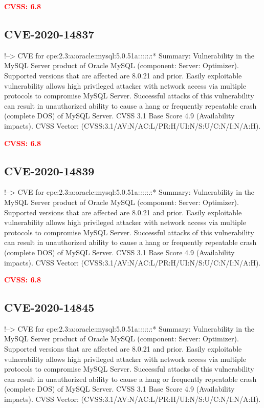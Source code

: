 \documentclass[a4paper, 12pt]{article}
\begin{document}
\textbf{\textcolor{red}{CVSS: 6.8}}

\hypertarget{cve-2020-14837}{%
\subsection{CVE-2020-14837}\label{cve-2020-14837}}

!--\textgreater{} CVE for
cpe:2.3:a:oracle:mysql:5.0.51a:\emph{:}:\emph{:}:\emph{:}:* Summary:
Vulnerability in the MySQL Server product of Oracle MySQL (component:
Server: Optimizer). Supported versions that are affected are 8.0.21 and
prior. Easily exploitable vulnerability allows high privileged attacker
with network access via multiple protocols to compromise MySQL Server.
Successful attacks of this vulnerability can result in unauthorized
ability to cause a hang or frequently repeatable crash (complete DOS) of
MySQL Server. CVSS 3.1 Base Score 4.9 (Availability impacts). CVSS
Vector: (CVSS:3.1/AV:N/AC:L/PR:H/UI:N/S:U/C:N/I:N/A:H).

\textbf{\textcolor{red}{CVSS: 6.8}}

\hypertarget{cve-2020-14839}{%
\subsection{CVE-2020-14839}\label{cve-2020-14839}}

!--\textgreater{} CVE for
cpe:2.3:a:oracle:mysql:5.0.51a:\emph{:}:\emph{:}:\emph{:}:* Summary:
Vulnerability in the MySQL Server product of Oracle MySQL (component:
Server: Optimizer). Supported versions that are affected are 8.0.21 and
prior. Easily exploitable vulnerability allows high privileged attacker
with network access via multiple protocols to compromise MySQL Server.
Successful attacks of this vulnerability can result in unauthorized
ability to cause a hang or frequently repeatable crash (complete DOS) of
MySQL Server. CVSS 3.1 Base Score 4.9 (Availability impacts). CVSS
Vector: (CVSS:3.1/AV:N/AC:L/PR:H/UI:N/S:U/C:N/I:N/A:H).

\textbf{\textcolor{red}{CVSS: 6.8}}

\hypertarget{cve-2020-14845}{%
\subsection{CVE-2020-14845}\label{cve-2020-14845}}

!--\textgreater{} CVE for
cpe:2.3:a:oracle:mysql:5.0.51a:\emph{:}:\emph{:}:\emph{:}:* Summary:
Vulnerability in the MySQL Server product of Oracle MySQL (component:
Server: Optimizer). Supported versions that are affected are 8.0.21 and
prior. Easily exploitable vulnerability allows high privileged attacker
with network access via multiple protocols to compromise MySQL Server.
Successful attacks of this vulnerability can result in unauthorized
ability to cause a hang or frequently repeatable crash (complete DOS) of
MySQL Server. CVSS 3.1 Base Score 4.9 (Availability impacts). CVSS
Vector: (CVSS:3.1/AV:N/AC:L/PR:H/UI:N/S:U/C:N/I:N/A:H).
\end{document}
